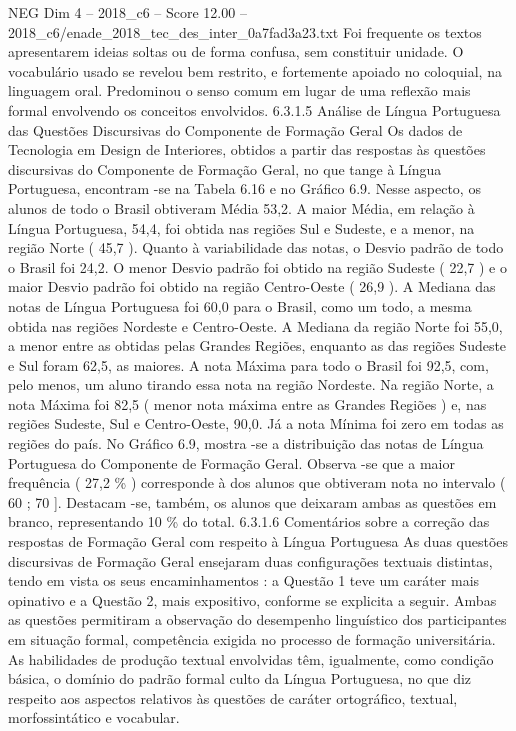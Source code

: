 \begin{textsample}{NEG Dim 4 – 2018\_c6 – Score 12.00 – 2018\_c6/enade\_2018\_tec\_des\_inter\_0a7fad3a23.txt}
Foi frequente os textos apresentarem ideias soltas ou de forma confusa, sem constituir unidade.
O vocabulário usado se revelou bem restrito, e fortemente apoiado no coloquial, na linguagem oral.
Predominou o senso comum em lugar de uma reflexão mais formal envolvendo os conceitos envolvidos. 6.3.1.5 Análise de Língua Portuguesa das Questões Discursivas do Componente de Formação Geral Os dados de Tecnologia em Design de Interiores, obtidos a partir das respostas às questões discursivas do Componente de Formação Geral, no que tange à Língua Portuguesa, encontram -se na Tabela 6.16 e no Gráfico 6.9.
Nesse aspecto, os alunos de todo o Brasil obtiveram Média 53,2.
A maior Média, em relação à Língua Portuguesa, 54,4, foi obtida nas regiões Sul e Sudeste, e a menor, na região Norte ( 45,7 ).
Quanto à variabilidade das notas, o Desvio padrão de todo o Brasil foi 24,2.
O menor Desvio padrão foi obtido na região Sudeste ( 22,7 ) e o maior Desvio padrão foi obtido na região Centro-Oeste ( 26,9 ).
A Mediana das notas de Língua Portuguesa foi 60,0 para o Brasil, como um todo, a mesma obtida nas regiões Nordeste e Centro-Oeste.
A Mediana da região Norte foi 55,0, a menor entre as obtidas pelas Grandes Regiões, enquanto as das regiões Sudeste e Sul foram 62,5, as maiores.
A nota Máxima para todo o Brasil foi 92,5, com, pelo menos, um aluno tirando essa nota na região Nordeste.
Na região Norte, a nota Máxima foi 82,5 ( menor nota máxima entre as Grandes Regiões ) e, nas regiões Sudeste, Sul e Centro-Oeste, 90,0.
Já a nota Mínima foi zero em todas as regiões do país.
No Gráfico 6.9, mostra -se a distribuição das notas de Língua Portuguesa do Componente de Formação Geral.
Observa -se que a maior frequência ( 27,2 \% ) corresponde à dos alunos que obtiveram nota no intervalo ( 60 ; 70 ].
Destacam -se, também, os alunos que deixaram ambas as questões em branco, representando 10 \% do total. 6.3.1.6 Comentários sobre a correção das respostas de Formação Geral com respeito à Língua Portuguesa As duas questões discursivas de Formação Geral ensejaram duas configurações textuais distintas, tendo em vista os seus encaminhamentos : a Questão 1 teve um caráter mais opinativo e a Questão 2, mais expositivo, conforme se explicita a seguir.
Ambas as questões permitiram a observação do desempenho linguístico dos participantes em situação formal, competência exigida no processo de formação universitária.
As habilidades de produção textual envolvidas têm, igualmente, como condição básica, o domínio do padrão formal culto da Língua Portuguesa, no que diz respeito aos aspectos relativos às questões de caráter ortográfico, textual, morfossintático e vocabular.

\end{textsample}

